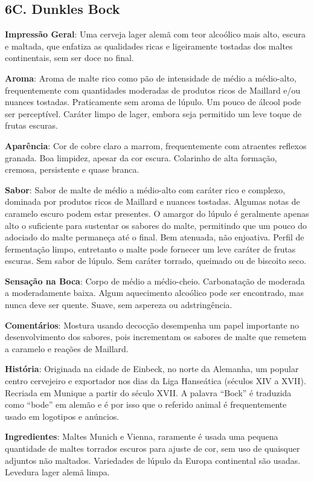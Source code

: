 \subsection*{6C. Dunkles Bock}
\textbf{Impressão Geral}: Uma cerveja lager alemã com teor alcoólico mais alto, escura e maltada, que enfatiza as qualidades ricas e ligeiramente tostadas dos maltes continentais, sem ser doce no final.

\textbf{Aroma}: Aroma de malte rico como pão de intensidade de médio a médio-alto, frequentemente com quantidades moderadas de produtos ricos de Maillard e/ou nuances tostadas. Praticamente sem aroma de lúpulo. Um pouco de álcool pode ser perceptível. Caráter limpo de lager, embora seja permitido um leve toque de frutas escuras.

\textbf{Aparência}: Cor de cobre claro a marrom, frequentemente com atraentes reflexos granada. Boa limpidez, apesar da cor escura. Colarinho de alta formação, cremosa, persistente e quase branca.

\textbf{Sabor}: Sabor de malte de médio a médio-alto com caráter rico e complexo, dominada por produtos ricos de Maillard e nuances tostadas. Algumas notas de caramelo escuro podem estar presentes. O amargor do lúpulo é geralmente apenas alto o suficiente para sustentar os sabores do malte, permitindo que um pouco do adociado do malte permaneça até o final. Bem atenuada, não enjoativa. Perfil de fermentação limpo, entretanto o malte pode fornecer um leve caráter de frutas escuras. Sem sabor de lúpulo. Sem caráter torrado, queimado ou de biscoito seco.

\textbf{Sensação na Boca}: Corpo de médio a médio-cheio. Carbonatação de moderada a moderadamente baixa. Algum aquecimento alcoólico pode ser encontrado, mas nunca deve ser quente. Suave, sem aspereza ou adstringência.

\textbf{Comentários}: Mostura usando decocção desempenha um papel importante no desenvolvimento dos sabores, pois incrementam os sabores de malte que remetem a caramelo e reações de Maillard.

\textbf{História}: Originada na cidade de Einbeck, no norte da Alemanha, um popular centro cervejeiro e exportador nos dias da Liga Hanseática (séculos XIV a XVII). Recriada em Munique a partir do século XVII. A palavra “Bock” é traduzida como “bode” em alemão e é por isso que o referido animal é frequentemente usado em logotipos e anúncios.

\textbf{Ingredientes}: Maltes Munich e Vienna, raramente é usada uma pequena quantidade de maltes torrados escuros para ajuste de cor, sem uso de quaisquer adjuntos não maltados. Variedades de lúpulo da Europa continental são usadas. Levedura lager alemã limpa.

